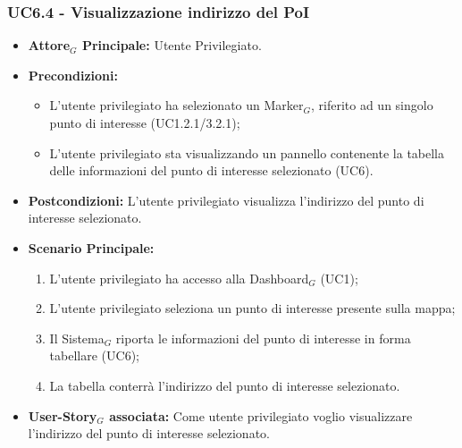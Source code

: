 \documentclass[10pt]{article}
\begin{document}
\begin{justify}
 \subsubsection{\textbf{UC6.4 - Visualizzazione indirizzo del PoI}}
 \begin{itemize}
     \item \textbf{Attore$_G$ Principale:} Utente Privilegiato.
     \item \textbf{Precondizioni:}
       \begin{itemize}
    	        \item L'utente privilegiato ha selezionato un Marker$_G$, riferito ad un singolo punto di interesse (UC1.2.1/3.2.1);
          \item L'utente privilegiato sta visualizzando un pannello contenente la tabella delle informazioni del punto di interesse selezionato (UC6).
       \end{itemize}
     \item \textbf{Postcondizioni:} L'utente privilegiato visualizza l'indirizzo del punto di interesse selezionato.
     \item \textbf{Scenario Principale:}
        \begin{enumerate}
            \item L'utente privilegiato ha accesso alla Dashboard$_G$ (UC1);
            \item L'utente privilegiato seleziona un punto di interesse presente sulla mappa;
            \item Il Sistema$_G$ riporta le informazioni del punto di interesse in forma tabellare (UC6);
            \item La tabella conterrà l'indirizzo del punto di interesse selezionato.
        \end{enumerate}
     \item \textbf{User-Story$_G$ associata:} Come utente privilegiato voglio visualizzare l'indirizzo del punto di interesse selezionato. 
 \end{itemize}

\end{justify}
\end{document}
